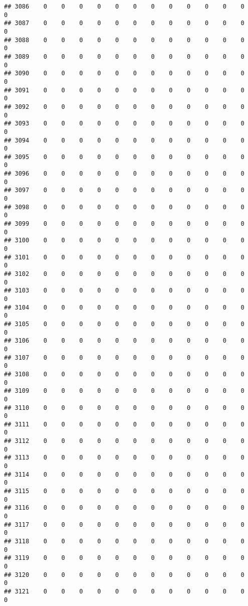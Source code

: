 \documentclass[]{article}
\begin{document}
\begin{verbatim}
## 3086    0    0    0    0    0    0    0    0    0    0    0    0    0
## 3087    0    0    0    0    0    0    0    0    0    0    0    0    0
## 3088    0    0    0    0    0    0    0    0    0    0    0    0    0
## 3089    0    0    0    0    0    0    0    0    0    0    0    0    0
## 3090    0    0    0    0    0    0    0    0    0    0    0    0    0
## 3091    0    0    0    0    0    0    0    0    0    0    0    0    0
## 3092    0    0    0    0    0    0    0    0    0    0    0    0    0
## 3093    0    0    0    0    0    0    0    0    0    0    0    0    0
## 3094    0    0    0    0    0    0    0    0    0    0    0    0    0
## 3095    0    0    0    0    0    0    0    0    0    0    0    0    0
## 3096    0    0    0    0    0    0    0    0    0    0    0    0    0
## 3097    0    0    0    0    0    0    0    0    0    0    0    0    0
## 3098    0    0    0    0    0    0    0    0    0    0    0    0    0
## 3099    0    0    0    0    0    0    0    0    0    0    0    0    0
## 3100    0    0    0    0    0    0    0    0    0    0    0    0    0
## 3101    0    0    0    0    0    0    0    0    0    0    0    0    0
## 3102    0    0    0    0    0    0    0    0    0    0    0    0    0
## 3103    0    0    0    0    0    0    0    0    0    0    0    0    0
## 3104    0    0    0    0    0    0    0    0    0    0    0    0    0
## 3105    0    0    0    0    0    0    0    0    0    0    0    0    0
## 3106    0    0    0    0    0    0    0    0    0    0    0    0    0
## 3107    0    0    0    0    0    0    0    0    0    0    0    0    0
## 3108    0    0    0    0    0    0    0    0    0    0    0    0    0
## 3109    0    0    0    0    0    0    0    0    0    0    0    0    0
## 3110    0    0    0    0    0    0    0    0    0    0    0    0    0
## 3111    0    0    0    0    0    0    0    0    0    0    0    0    0
## 3112    0    0    0    0    0    0    0    0    0    0    0    0    0
## 3113    0    0    0    0    0    0    0    0    0    0    0    0    0
## 3114    0    0    0    0    0    0    0    0    0    0    0    0    0
## 3115    0    0    0    0    0    0    0    0    0    0    0    0    0
## 3116    0    0    0    0    0    0    0    0    0    0    0    0    0
## 3117    0    0    0    0    0    0    0    0    0    0    0    0    0
## 3118    0    0    0    0    0    0    0    0    0    0    0    0    0
## 3119    0    0    0    0    0    0    0    0    0    0    0    0    0
## 3120    0    0    0    0    0    0    0    0    0    0    0    0    0
## 3121    0    0    0    0    0    0    0    0    0    0    0    0    0

\end{verbatim}
\end{document}
